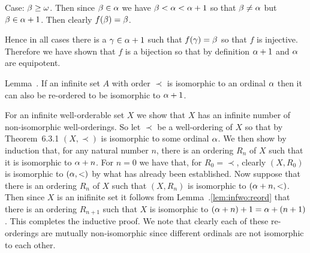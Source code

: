 \begin{solution}
{      Case: $\beta \geq \omega$.
      Then since $\beta \in \alpha$ we have $\beta < \alpha < \alpha+1$ so that $\beta \neq \alpha$ but $\beta \in \alpha+1$.
      Then clearly $f(\beta) = \beta$.

      Hence in all cases there is a $\gamma \in \alpha+1$ such that $f(\gamma) = \beta$ so that $f$ is injective.
      Therefore we have shown that $f$ is a bijection so that by definition $\alpha+1$ and $\alpha$ are equipotent. \qedsymbol

      \begin{statement}{Lemma~\ex.}
        If an infinite set $A$ with order $\prec$ is isomorphic to an ordinal $\alpha$ then it can also be re-ordered to be isomorphic to $\alpha + 1$.
      \end{statement}


      \mainprob

      For an infinite well-orderable set $X$ we show that $X$ has an infinite number of non-isomorphic well-orderings.
      So let $\prec$ be a well-ordering of $X$ so that by Theorem~6.3.1 $(X, \prec)$ is isomorphic to some ordinal $\alpha$.
      We then show by induction that, for any natural number $n$, there is an ordering $R_n$ of $X$ such that it is isomorphic to $\alpha + n$.
      For $n=0$ we have that, for $R_0 = \prec$, clearly $(X, R_0)$ is isomorphic to $(\alpha, <)$ by what has already been established.
      Now suppose that there is an ordering $R_n$ of $X$ such that $(X, R_n)$ is isomorphic to $(\alpha + n, <)$.
      Then since $X$ is an inifinite set it follows from Lemma~\ex.\ref{lem:infwo:reord} that there is an ordering $R_{n+1}$ such that $X$ is isomorphic to $(\alpha + n) + 1 = \alpha + (n+1)$.
      This completes the inductive proof.
      We note that clearly each of these re-orderings are mutually non-isomorphic since different ordinals are not isomorphic to each other. \qedsymbol
    }
\end{solution}

